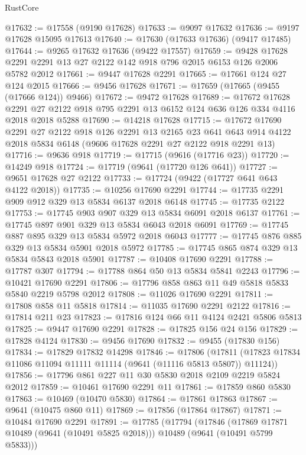 \begin{lexlean}{RustCore}
\begin{coremodule}
@17632 := @17558 (@9190 @17628)
@17633 := @9097 @17632
@17636 := @9197 @17628 @15095 @17613
@17640 := @17630 (@17633 @17636) (@9417 @17485)
@17644 := @9265 @17632 @17636 (@9422 @17557)
@17659 := @9428 @17628 @2291 @2291 @13 @27 @2122 @142 @918 @796 @2015 @6153 @126 @2006 @5782 @2012
@17661 := @9447 @17628 @2291
@17665 := @17661 @124 @27 @124 @2015
@17666 := @9456 @17628
@17671 := @17659 (@17665 (@9455 (@17666 @124)) @9466)
@17672 := @9472 @17628
@17689 := @17672
    @17628
    @2291
    @27
    @2122
    @918
    @795
    @2291
    @13
    @6152
    @124
    @636
    @126
    @334
    @4116
    @2018
    @2018
    @5288
@17690 := @14218 @17628
@17715 := @17672
    @17690
    @2291
    @27
    @2122
    @918
    @126
    @2291
    @13
    @2165
    @23
    @641
    @643
    @914
    @4122
    @2018
    @5834
    @6148
    (@9606 @17628 @2291 @27 @2122 @918 @2291 @13)
@17716 := @9636 @918
@17719 := @17715 (@9616 (@17716 @23))
@17720 := @14249 @918
@17724 := @17719 (@9641 (@17720 @126 @641))
@17727 := @9651 @17628 @27 @2122
@17733 := @17724 (@9422 (@17727 @641 @643 @4122 @2018))
@17735 := @10256 @17690 @2291
@17744 := @17735 @2291 @909 @912 @329 @13 @5834 @6137 @2018 @6148
@17745 := @17735 @2122
@17753 := @17745 @903 @907 @329 @13 @5834 @6091 @2018 @6137
@17761 := @17745 @897 @901 @329 @13 @5834 @6043 @2018 @6091
@17769 := @17745 @887 @895 @329 @13 @5834 @5972 @2018 @6043
@17777 := @17745 @876 @885 @329 @13 @5834 @5901 @2018 @5972
@17785 := @17745 @865 @874 @329 @13 @5834 @5843 @2018 @5901
@17787 := @10408 @17690 @2291
@17788 := @17787 @307
@17794 := @17788 @864 @50 @13 @5834 @5841 @2243
@17796 := @10421 @17690 @2291
@17806 := @17796 @858 @863 @11 @49 @5818 @5833 @5840 @2219 @5798 @2012
@17808 := @11026 @17690 @2291
@17811 := @17808 @858 @11 @5818
@17814 := @11035 @17690 @2291 @2122
@17816 := @17814 @211 @23
@17823 := @17816 @124 @66 @11 @4124 @2421 @5806 @5813
@17825 := @9447 @17690 @2291
@17828 := @17825 @156 @24 @156
@17829 := @17828 @4124
@17830 := @9456 @17690
@17832 := @9455 (@17830 @156)
@17834 := @17829 @17832 @14298
@17846 := @17806
    (@17811 (@17823 @17834 @11086 @11094 @11111 @11114 (@9641 (@11116 @5813 @5807)) @11124))
@17856 := @17796 @861 @227 @11 @30 @5830 @2018 @2109 @2219 @5824 @2012
@17859 := @10461 @17690 @2291 @11
@17861 := @17859 @860 @5830
@17863 := @10469 (@10470 @5830)
@17864 := @17861 @17863
@17867 := @9641 (@10475 @860 @11)
@17869 := @17856 (@17864 @17867)
@17871 := @10484 @17690 @2291
@17891 := @17785
    (@17794
      (@17846
        (@17869 @17871 @10489 (@9641 (@10491 @5825 @2018)))
        @10489
        (@9641 (@10491 @5799 @5833)))

\end{coremodule}
\end{lexlean}

